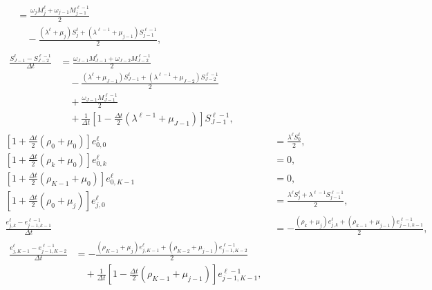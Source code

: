 \documentclass[USenglish]{article}
\begin{document}
\begin{subequations}
\begin{align}
\begin{split}
      &=
      \frac{\omega_j M_j^{\ell}
        + \omega_{j - 1} M_{j - 1}^{\ell - 1}}
      {2}
      \\ & \quad {}
      - \frac{(\lambda^{\ell} + \mu_j) S_j^{\ell}
        + (\lambda^{\ell - 1} + \mu_{j - 1}) S_{j - 1}^{\ell - 1}}
      {2},
    \end{split}
    \\
    \begin{split}
      \frac{S_{J - 1}^{\ell} - S_{J - 2}^{\ell - 1}}{\Delta t}
      &=
      \frac{\omega_{J - 1} M_{J - 1}^{\ell}
        + \omega_{J - 2} M_{J - 2}^{\ell - 1}}
      {2}
      \\ & \quad {}
      - \frac{(\lambda^{\ell} + \mu_{J - 1}) S_{J - 1}^{\ell}
        + (\lambda^{\ell - 1} + \mu_{J - 2}) S_{J - 2}^{\ell - 1}}
      {2}
      \\ & \quad {}
      + \frac{\omega_{J - 1} M_{J - 1}^{\ell - 1}}{2}
      \\ & \quad {}
      + \frac{1}{\Delta t} \left[
        1 - \frac{\Delta t}{2} (\lambda^{\ell - 1} + \mu_{J - 1})
      \right] S_{J - 1}^{\ell - 1},
    \end{split}
    \\
    \left[1 + \frac{\Delta t}{2} (\rho_0 + \mu_0)\right] e_{0, 0}^{\ell}
    &=
    \frac{\lambda^{\ell} S_0^{\ell}}{2},
    \\
    \left[1 + \frac{\Delta t}{2} (\rho_k + \mu_0)\right] e_{0, k}^{\ell}
    &= 0,
    \\
    \left[1 + \frac{\Delta t}{2} (\rho_{K - 1} + \mu_0)\right] e_{0, K - 1}^{\ell}
    &= 0,
    \\
    \left[1 + \frac{\Delta t}{2} (\rho_0 + \mu_j)\right] e_{j, 0}^{\ell}
    &=
    \frac{\lambda^{\ell} S_j^{\ell}
      + \lambda^{\ell - 1} S_{j - 1}^{\ell - 1}}
    {2},
    \\
    \frac{e_{j, k}^{\ell} - e_{j - 1, k - 1}^{\ell - 1}}{\Delta t}
    &= - \frac{(\rho_k + \mu_j) e_{j, k}^{\ell}
      + (\rho_{k - 1} + \mu_{j - 1}) e_{j - 1, k - 1}^{\ell - 1}}
    {2},
    \\
    \begin{split}
      \frac{e_{j, K - 1}^{\ell} - e_{j - 1, K - 2}^{\ell - 1}}{\Delta t}
      &= - \frac{(\rho_{K - 1} + \mu_j) e_{j, K - 1}^{\ell}
        + (\rho_{K - 2} + \mu_{j - 1}) e_{j - 1, K - 2}^{\ell - 1}}
      {2}
      \\ & \quad {}
      + \frac{1}{\Delta t} \left[
        1 - \frac{\Delta t}{2} (\rho_{K - 1} + \mu_{j - 1})
      \right] e_{j - 1, K - 1}^{\ell - 1},
    \end{split}

\end{align}
\end{subequations}
\end{document}
